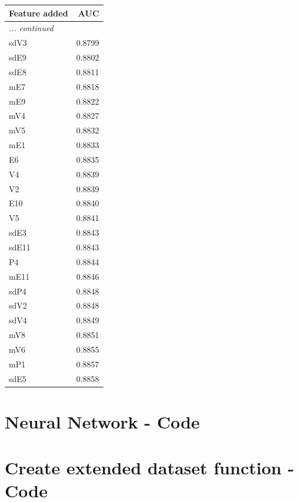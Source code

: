 {\begin{minipage}[t]{40mm}
\vspace{0pt}
\begin{tabularx}{40mm}{ l R }
Feature added & AUC \\\hline
{\itshape ... continued} \\
sdV3 & 0.8799 \\
sdE9 & 0.8802 \\
sdE8 & 0.8811 \\
mE7 & 0.8818 \\
mE9 & 0.8822 \\
mV4 & 0.8827 \\
mV5 & 0.8832 \\
mE1 & 0.8833 \\
E6 & 0.8835 \\
V4 & 0.8839 \\
V2 & 0.8839 \\
E10 & 0.8840 \\
V5 & 0.8841 \\
sdE3 & 0.8843 \\
sdE11 & 0.8843 \\
P4 & 0.8844 \\
mE11 & 0.8846 \\
sdP4 & 0.8848 \\
sdV2 & 0.8848 \\
sdV4 & 0.8849 \\
mV8 & 0.8851 \\
mV6 & 0.8855 \\
mP1 & 0.8857 \\
sdE5 & 0.8858 \\
\end{tabularx}
\end{minipage}
}

\clearpage

\section{Neural Network - Code} %
\label{app:source-neural-network}


\clearpage

\section{Create extended dataset function - Code} %
\label{sec:Create extended dataset function - Code}


